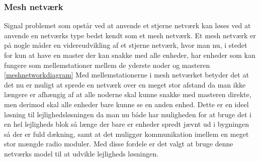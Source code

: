 \subsubsection*{Mesh netværk}
Signal problemet som opstår ved at anvende et stjerne netværk kan løses ved at anvende en netværks type bedst kendt som et mesh netværk.
Et mesh netværk er på nogle måder en videreudvikling af et stjerne netværk, hvor man nu, i stedet for kun at have en master der kan snakke med alle enheder, har enheder som kan fungere som mellemstationer mellem de yderste noder og masteren \ref{meshnetworkdiagram}
Med mellemstationerne i mesh netværket betyder det at det nu er muligt at sprede en netværk over en meget stor afstand da man ikke længere er afhængig af at alle noderne skal kunne snakke med masteren direkte, men derimod skal alle enheder bare kunne se en anden enhed. Dette er en ideel løsning til lejlighedsløsningen da man nu både har muligheden for at bruge det i en hel lejligheds blok så længe der bare er enheder spredt jævnt ud i bygningen så der er fuld dækning, samt at det muliggør kommunikation imellem en meget stor mængde radio moduler. Med disse fordele er det valgt at bruge denne netværks model til at udvikle lejligheds løsningen.

